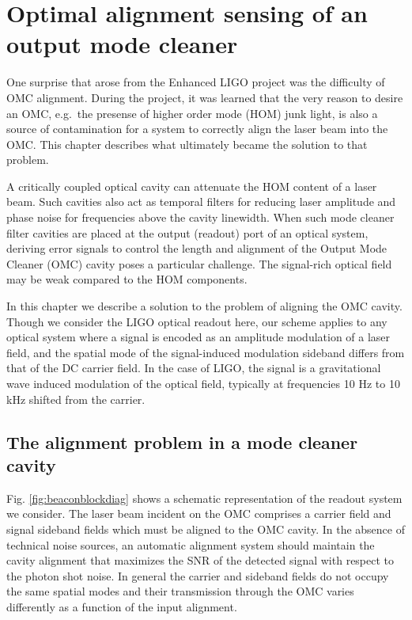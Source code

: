 \chapter{Optimal alignment sensing of an output mode cleaner}
\label{ch:beacon}
One surprise that arose from the Enhanced LIGO project was the difficulty of OMC alignment. %
During the project, it was learned that the very reason to desire an OMC, e.g.\ the presense of higher order mode (HOM) junk light, is also a source of contamination for a system to correctly align the laser beam into the OMC. %
This chapter describes what ultimately became the solution to that problem.

A critically coupled optical cavity can attenuate the HOM content of a laser beam. %
Such cavities also act as temporal filters for reducing laser amplitude and phase noise for frequencies above the cavity linewidth. %
When such mode cleaner filter cavities are placed at the output (readout) port of an optical system, deriving error signals to control the length and alignment of the Output Mode Cleaner (OMC) cavity poses a particular challenge. %
The signal-rich optical field may be weak compared to the HOM components. %


In this chapter we describe a solution to the problem of aligning the OMC cavity. %
Though we consider the LIGO optical readout here, our scheme applies to any optical system where a signal is encoded as an amplitude modulation of a laser field, and the spatial mode of the signal-induced modulation sideband differs from that of the DC carrier field. %
 In the case of LIGO, the signal is a gravitational wave induced modulation of the optical field, typically at frequencies 10 Hz to 10 kHz shifted from the carrier. %


\section{The alignment problem in a mode cleaner cavity}
\label{sec:alignsnr}
Fig. %
\ref{fig:beaconblockdiag} shows a schematic representation of the readout system we consider. %
The laser beam incident on the OMC comprises a carrier field and signal sideband fields which must be aligned to the OMC cavity. %
In the absence of technical noise sources, an automatic alignment system should maintain the cavity alignment that maximizes the SNR of the detected signal with respect to the photon shot noise. %
In general the carrier and sideband fields do not occupy the same spatial modes and their transmission through the OMC varies differently as a function of the input alignment. %


